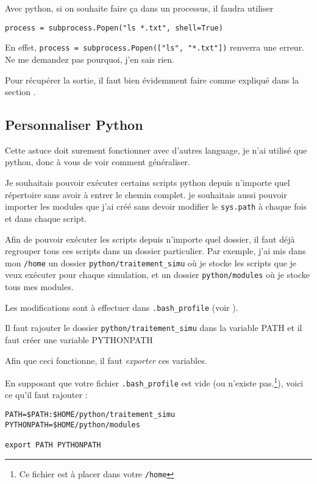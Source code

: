 \documentclass[a4paper,twoside]{article}
\begin{document}
Avec python, si on souhaite faire ça dans un processus, il faudra utiliser
\begin{verbatim}
process = subprocess.Popen("ls *.txt", shell=True)
\end{verbatim}

En effet, \verb|process = subprocess.Popen(["ls", "*.txt"])| renverra une erreur. Ne me demandez pas pourquoi, j'en sais rien.

\begin{remarque}
Pour récupérer la sortie, il faut bien évidemment faire comme expliqué dans la section .
\end{remarque}

\subsection{Personnaliser Python}
Cette astuce doit surement fonctionner avec d'autres language, je  n'ai utilisé que python, donc à vous de voir comment généraliser.

Je souhaitais pouvoir exécuter certains scripts python depuis  n'importe quel répertoire sans avoir à entrer le chemin complet. je  souhaitais aussi pouvoir importer les modules que j'ai créé sans  devoir modifier le \texttt{sys.path} à chaque fois et dans chaque  script.

Afin de pouvoir exécuter les scripts depuis n'importe quel dossier,  il faut déjà regrouper tous ces scripts dans un dossier particulier.  Par exemple, j'ai mis dans mon \texttt{/home} un dossier \texttt {python/traitement\_simu} où je stocke les scripts que je veux  exécuter pour chaque simulation, et un dossier \texttt{python/modules} où je stocke tous mes modules.

Les modifications sont à effectuer dans \texttt{.bash\_profile} (voir  ).

Il faut rajouter le dossier \texttt{python/traitement\_simu} dans la  variable PATH et il faut créer une variable PYTHONPATH

\begin{attention}
Afin que ceci fonctionne, il faut \emph{exporter} ces variables.
\end{attention}

En supposant que votre fichier \texttt{.bash\_profile} est vide (ou  n'existe pas.\footnote{Ce fichier est à placer dans votre \texttt{/home}}), voici ce qu'il faut rajouter :
\begin{verbatim}
PATH=$PATH:$HOME/python/traitement_simu
PYTHONPATH=$HOME/python/modules

export PATH PYTHONPATH
\end{verbatim}
\end{document}
